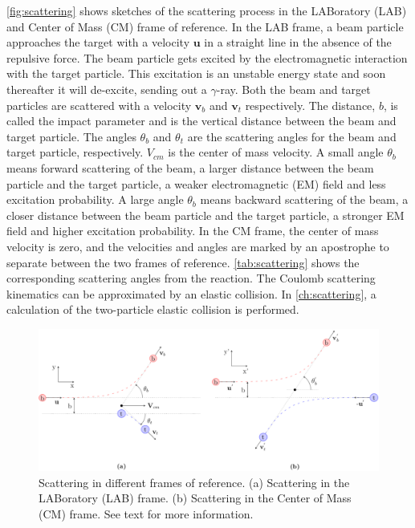 \documentclass[twoside,english]{uiofysmaster/uiofysmaster}
\newcommand{\ga}{$\gamma$}
\let\orgautoref\autoref
\renewcommand{\autoref}
        {%
		 \def\sectionautorefname{Section}%
		 \def\subsectionautorefname{Section}%
		 \def\subsubsectionautorefname{Section}%
		 \def\chapterautorefname{Chapter}%
          \orgautoref}
\begin{document}
\autoref{fig:scattering} shows sketches of the scattering process in the LABoratory (LAB) and Center of Mass (CM) frame of reference. 
In the LAB frame, a beam particle approaches the target with a velocity $\mathbf{u}$ in a straight line in the absence of the repulsive force. 
The beam particle gets excited by the electromagnetic interaction with the target particle. 
This excitation is an unstable energy state and soon thereafter it will de-excite, sending out a \ga-ray.
Both the beam and target particles are scattered with a velocity $\mathbf{v}_b$ and $\mathbf{v}_t$ respectively.
The distance, $b$, is called the impact parameter and is the vertical distance between the beam and target particle. 
The angles $\theta_b$ and $\theta_t$ are the scattering angles for the beam and target particle, respectively. 
$V_{cm}$ is the center of mass velocity. 
A small angle $\theta_b$ means forward scattering of the beam, a larger distance between the beam particle and the target particle, a weaker electromagnetic (EM) field and less excitation probability. 
A large angle $\theta_b$ means backward scattering of the beam, a closer distance between the beam particle and the target particle, a stronger EM field and higher excitation probability.
In the CM frame, the center of mass velocity is zero, and the velocities and angles are marked by an apostrophe to separate between the two frames of reference.
\autoref{tab:scattering} shows the corresponding scattering angles from the reaction. 
The Coulomb scattering kinematics can be approximated by an elastic collision.
In \autoref{ch:scattering}, a calculation of the two-particle elastic collision is performed.

\begin{figure}[htb]
	\centering
	\includegraphics[width=\textwidth]{Images/scattering.png}
	\caption{Scattering in different frames of reference.
	(a) Scattering in the LABoratory (LAB) frame. 
	(b) Scattering in the Center of Mass (CM) frame. 
	See text for more information.}
	\label{fig:scattering}
\end{figure}
\end{document}
